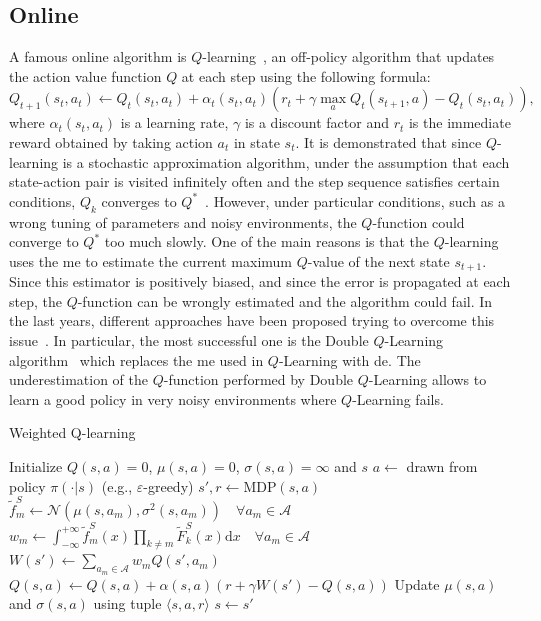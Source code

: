 \subsection{Online}
A famous online algorithm is $Q$-learning~\cite{watkins1989learning}, an off-policy algorithm that updates the action value function $Q$ at each step using the following formula:
\begin{equation}\label{eq:Q-formula}
 Q_{t+1}(s_t,a_t) \leftarrow Q_t(s_t,a_t) + \alpha_t(s_t,a_t) \left(r_t + \gamma \max_a Q_t(s_{t+1},a) - Q_t(s_t,a_t)\right),
\end{equation}
where $\alpha_t(s_t,a_t)$ is a learning rate, $\gamma$ is a discount factor and $r_t$ is the immediate reward obtained by taking action $a_t$ in state $s_t$.
It is demonstrated that since $Q$-learning is a stochastic approximation algorithm, under the assumption that each state-action pair is visited infinitely often and the step sequence satisfies certain conditions, $Q_k$ converges to $Q^{*}$~\cite{watkins1989learning}. However, under particular conditions, such as a wrong tuning of parameters and noisy environments, the $Q$-function could converge to $Q^{*}$ too much slowly. One of the main reasons is that the $Q$-learning uses the \gls{me} to estimate the current maximum $Q$-value of the next state $s_{t+1}$. Since this estimator is positively biased, and since the error is propagated at each step, the $Q$-function can be wrongly estimated and the algorithm could fail.
In the last years, different approaches have been proposed trying to overcome this issue~\cite{lee2013bias,bellemare2015increasing,ijcai2017-483}. In particular, the most successful one is the Double $Q$-Learning algorithm~\cite{van2010double} which replaces the \gls{me} used in $Q$-Learning with \gls{de}. The underestimation of the $Q$-function performed by Double $Q$-Learning allows to learn a good policy in very noisy environments where $Q$-Learning fails.

\begin{algorithm}[t]
\caption{Weighted Q-learning}
\label{A:WQ-Learning}
\begin{algorithmic}[1]
\STATE Initialize $Q(s,a) = 0$, $\mu(s,a) = 0$, $\sigma(s,a) = \infty$ and $s$
\REPEAT
\STATE $a \leftarrow$ drawn from policy $\pi(\cdot|s)$ (e.g., $\varepsilon$-greedy)
\STATE $s',r \leftarrow \text{MDP}(s,a)$
\STATE $\tilde{f}_m^S \leftarrow \mathcal{N}(\mu(s,a_m), \sigma^2(s,a_m))\quad \forall a_m \in \mathcal{A}$ 
\STATE $w_m \leftarrow \int_{-\infty}^{+\infty} \tilde{f}_m^S(x) \prod_{k\neq m} \tilde{F}^S_k(x) \mathrm{d}x \quad \forall a_m \in \mathcal{A}$
\STATE $W(s') \leftarrow \sum_{a_m \in \mathcal{A}} w_m Q(s',a_m)$
\STATE $Q(s,a) \leftarrow Q(s,a) + \alpha(s,a) (r + \gamma W(s') - Q(s,a))$
\STATE Update $\mu(s,a)$ and $\sigma(s,a)$ using tuple $\langle s,a,r \rangle$
\STATE $s \leftarrow s'$
\end{algorithmic}
\end{algorithm}

